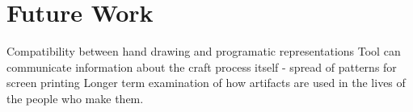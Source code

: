 \documentclass{sigchi}
\begin{document}
\section{Future Work}
Compatibility between hand drawing and programatic representations
Tool can communicate information about the craft process itself - spread of patterns for screen printing
Longer term examination of how artifacts are used in the lives of the people who make them.



{\footnotesize
}
\end{document}
